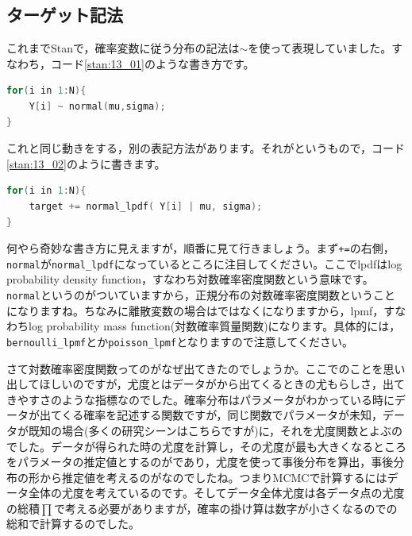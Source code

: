 \documentclass{ltjsbook}
\begin{document}
\subsection{ターゲット記法}
これまでStanで，確率変数に従う分布の記法は$\sim$を使って表現していました。すなわち，コード\ref{stan:13_01}のような書き方です。
\begin{lstlisting}[language=C++,label={stan:13_01},caption={sampling記法}]
for(i in 1:N){
    Y[i] ~ normal(mu,sigma);
}
\end{lstlisting}
これと同じ動きをする，別の表記方法があります。それがというもので，コード\ref{stan:13_02}のように書きます。
\begin{lstlisting}[language=C++,label={stan:13_02},caption={target記法}]
for(i in 1:N){
    target += normal_lpdf( Y[i] | mu, sigma);
}
\end{lstlisting}

何やら奇妙な書き方に見えますが，順番に見て行きましょう。まず\verb|+=|の右側，\verb|normal|が\verb|normal_lpdf|になっているところに注目してください。ここでlpdfはlog probability density function，すなわち対数確率密度関数という意味です。\verb|normal|というのがついていますから，正規分布の対数確率密度関数ということになりますね。ちなみに離散変数の場合はではなくになりますから，lpmf，すなわちlog probability mass function(対数確率質量関数)になります。具体的には，\verb|bernoulli_lpmf|とか\verb|poisson_lpmf|となりますので注意してください。

さて対数確率密度関数ってのがなぜ出てきたのでしょうか。ここでのことを思い出してほしいのですが，尤度とはデータがから出てくるときの尤もらしさ，出てきやすさのような指標なのでした。確率分布はパラメータがわかっている時にデータが出てくる確率を記述する関数ですが，同じ関数でパラメータが未知，データが既知の場合(多くの研究シーンはこちらですが)に，それを尤度関数とよぶのでした。データが得られた時の尤度を計算し，その尤度が最も大きくなるところをパラメータの推定値とするのがであり，尤度を使って事後分布を算出，事後分布の形から推定値を考えるのがなのでしたね。つまりMCMCで計算するにはデータ全体の尤度を考えているのです。そしてデータ全体尤度は各データ点の尤度の総積$\prod$で考える必要がありますが，確率の掛け算は数字が小さくなるのでの総和で計算するのでした。
\end{document}

